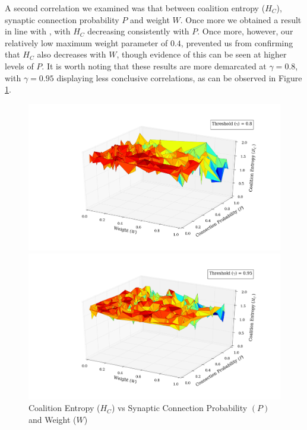 \documentclass[a4paper,11pt]{article}
\begin{document}
A second correlation we examined was that between coalition entropy ($H_C$), synaptic connection probability $P$ and weight $W$. Once more we obtained a result in line with \cite{Bhowmik2013}, with $H_C$ decreasing consistently with $P$. Once more, however, our relatively low maximum weight parameter of $0.4$, prevented us from confirming that $H_C$ also decreases with $W$, though evidence of this can be seen at higher levels of $P$. It is worth noting that these results are more demarcated at $\gamma = 0.8$, with $\gamma = 0.95$ displaying less conclusive correlations, as can be observed in Figure \ref{fig:p_w_psi_all}.

\begin{figure}[H] 
	\begin{minipage}[b]{0.5\linewidth}
		\begin{center}
		\includegraphics[scale = 0.2]{figures/snn/p_w_hc_8_1}
		\end{center}
		\vspace{4ex}
	\end{minipage}
	\begin{minipage}[b]{0.5\linewidth}
		\begin{center}
		\includegraphics[scale = 0.2]{figures/snn/p_w_hc_95_1}
		\end{center}
		\vspace{4ex}
	\end{minipage}
	\caption{
			Coalition Entropy ($H_C$) vs Synaptic Connection Probability $(P)$ and Weight ($W$)
			\label{fig:p_w_psi_all}
		}
\end{figure}
\end{document}
